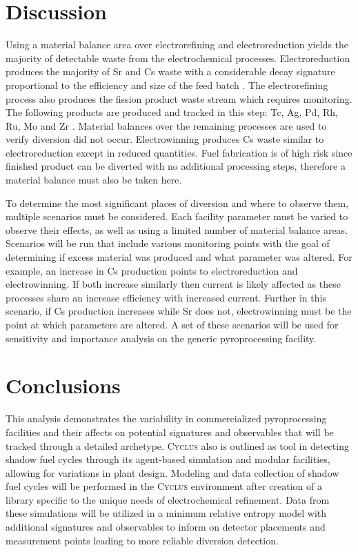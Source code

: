 \documentclass{anstrans}
\newcommand{\Cyclus}{\textsc{Cyclus}\xspace}%
\begin{document}
\section{Discussion}
Using a material balance area over electrorefining and electroreduction yields the majority of detectable waste from 
the electrochemical processes. Electroreduction produces the majority of Sr and Cs waste with a considerable decay 
signature proportional to the efficiency and size of the feed batch \cite{Borrelli_2017,flowsheet_1998}. The electrorefining 
process also produces the fission product waste stream which requires monitoring. The following products are produced 
and tracked in this step: Tc, Ag, Pd, Rh, Ru, Mo and Zr \cite{flowsheet_1998}. Material balances over the remaining 
processes are used to verify diversion did not occur. Electrowinning produces Cs waste similar to electroreduction 
except in reduced quantities. Fuel fabrication is of high risk since finished product can be diverted with no additional 
processing steps, therefore a material balance must also be taken here. 

To determine the most significant places of diversion and where to observe them, multiple scenarios must be considered. 
Each facility parameter must be varied to observe their effects, as well as using a limited number of material balance areas. 
Scenarios will be run that include various monitoring points with the goal of determining if excess material was produced 
and what parameter was altered. For example, an increase in Cs production points to electroreduction and electrowinning. 
If both increase similarly then current is likely affected as these processes share an increase efficiency with increased 
current. Further in this scenario, if Cs production increases while Sr does not, electrowinning must be the point at which 
parameters are altered. A set of these scenarios will be used for sensitivity and importance analysis on the generic 
pyroprocessing facility.

\section{Conclusions}
This analysis demonstrates the variability in commercialized pyroprocessing facilities and their affects on potential 
signatures and observables that will be tracked through a detailed archetype. \Cyclus also is outlined as tool in 
detecting shadow fuel cycles through its agent-based simulation and modular facilities, allowing for variations in 
plant design. Modeling and data collection of shadow fuel cycles will be performed in the \Cyclus environment after 
creation of a library specific to the unique needs of electrochemical refinement. Data from these simulations will 
be utilized in a minimum relative entropy model with additional signatures and observables to inform on detector 
placements and measurement points leading to more reliable diversion detection.
\end{document}
